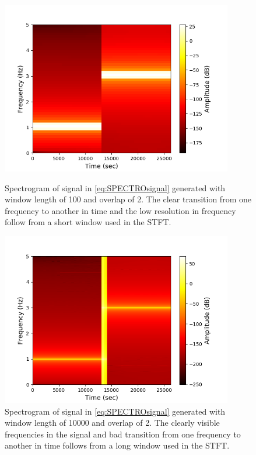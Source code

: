 \begin{figure}[H]
\centering
\begin{minipage}{0.49\textwidth}
\centering
\includegraphics[width=0.9\textwidth]{figures/validation/stft/1.png}
\caption{Spectrogram of signal in \eqref{eq:SPECTROsignal} generated with window length of 100 and overlap of 2. The clear transition from one frequency to another in time and the low resolution in frequency follow from a short window used in the STFT.}
\label{fig:test_stft1}
\end{minipage}
\begin{minipage}{0.49\textwidth}
\centering
\includegraphics[width=0.9\textwidth]{figures/validation/stft/2.png}
\caption{Spectrogram of signal in \eqref{eq:SPECTROsignal} generated with window length of 10000 and overlap of 2. The clearly visible frequencies in the signal and bad transition from one frequency to another in time follows from a long window used in the STFT.}
\label{fig:test_stft2}
\end{minipage}
\end{figure}
